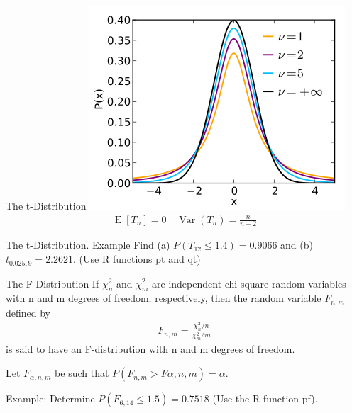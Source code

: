 \documentclass{beamer}
\newcommand{\E}{\operatorname{E}}
\newcommand{\Var}{\operatorname{Var}}
\renewcommand{\P}[1]{P\left(#1\right)}
\begin{document}
\begin{frame}{The t-Distribution}
  \includegraphics[width=0.8\linewidth]{Student_t_pdf}
  \begin{align*}
    \E[T_n] = 0 \quad \Var(T_n) = \frac{n}{n-2}
  \end{align*}
\end{frame}

\begin{frame}[t]{The t-Distribution. Example}
  Find (a) $\P{T_{12} \leq 1.4}=0.9066$ and (b) $t_{0.025,9}=2.2621$. (Use R
  functions pt and qt)
\end{frame}

\begin{frame}{The F-Distribution}
  If $\chi_n^2$ and $\chi_m^2$ are independent chi-square random variables with
  n and m degrees of freedom, respectively, then the random variable $F_{n,m}$
  defined by
  \begin{align*}
    F_{n,m} = \frac{\chi_n^2/n}{\chi_m^2/m}
  \end{align*}
  is said to have an F-distribution with n and m degrees of freedom.

  Let $F_{\alpha,n,m}$ be such that $\P{F_{n,m} > F{\alpha,n,m} } = \alpha$.

  Example: Determine $\P{F_{6,14} \leq 1.5} = 0.7518$ (Use the R function pf).
\end{frame}
\end{document}
